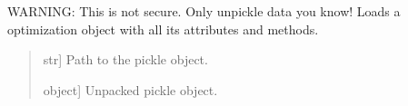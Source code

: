 \documentclass[letterpaper,10pt,english]{sphinxmanual}
\begin{document}
\begin{fulllineitems}
\label{\detokenize{modules/dsptoolbox.standard_functions:dsptoolbox.standard_functions.load_pkl_object}}
\pysigstartsignatures
{}
\pysigstopsignatures
\sphinxAtStartPar
WARNING: This is not secure. Only unpickle data you know!
Loads a optimization object with all its attributes and methods.
\begin{quote}\begin{description}
\begin{description}
\sphinxlineitem{\sphinxstylestrong{path}}{[}str{]}
\sphinxAtStartPar
Path to the pickle object.

\end{description}

\begin{description}
\sphinxlineitem{\sphinxstylestrong{obj}}{[}object{]}
\sphinxAtStartPar
Unpacked pickle object.

\end{description}

\end{description}\end{quote}

\end{fulllineitems}

\end{document}
